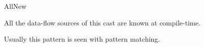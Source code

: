 
\begin{pattern}{AllNew}

All the data-flow sources of this cast are known at compile-time.

Usually this pattern is seen with pattern matching.

\end{pattern}

